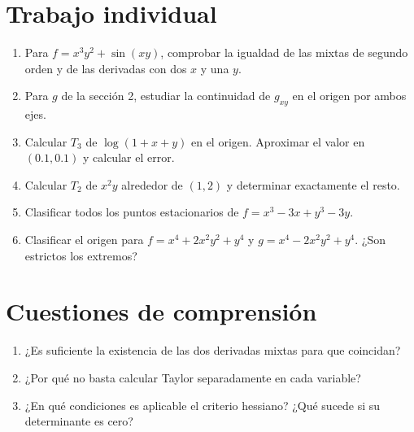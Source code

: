 \documentclass[12pt,a4paper]{article}
\begin{document}
\section{Trabajo individual}\begin{enumerate}
\item Para $f=x^3y^2+\sin(xy)$, comprobar la igualdad de las mixtas de segundo orden y de las derivadas con dos $x$ y una $y$.
\item Para $g$ de la sección 2, estudiar la continuidad de $g_{xy}$ en el origen por ambos ejes.
\item Calcular $T_3$ de $\log(1+x+y)$ en el origen. Aproximar el valor en $(0.1,0.1)$ y calcular el error.
\item Calcular $T_2$ de $x^2y$ alrededor de $(1,2)$ y determinar exactamente el resto.
\item Clasificar todos los puntos estacionarios de $f=x^3-3x+y^3-3y$.
\item Clasificar el origen para $f=x^4+2x^2y^2+y^4$ y $g=x^4-2x^2y^2+y^4$. ¿Son estrictos los extremos?
\end{enumerate}
\section{Cuestiones de comprensión}
\begin{enumerate}
\item ¿Es suficiente la existencia de las dos derivadas mixtas para que coincidan?
\item ¿Por qué no basta calcular Taylor separadamente en cada variable?
\item ¿En qué condiciones es aplicable el criterio hessiano? ¿Qué sucede si su determinante es cero?
\end{enumerate}
\end{document}
